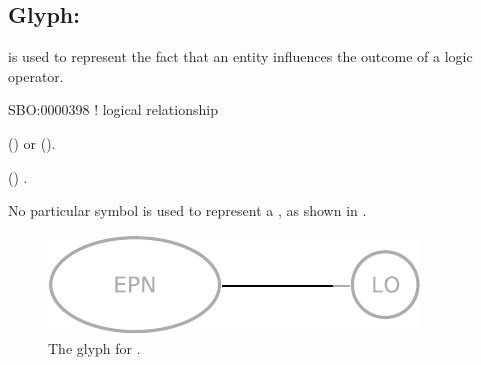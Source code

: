\subsection{Glyph: }
\label{sec:logicArc}

 is used to represent the fact that an entity  influences
the outcome of a logic operator.

\begin{glyphDescription}

\glyphSboTerm
SBO:0000398 ! logical relationship

\glyphOrigin
{}  () or  ().

\glyphTarget
{}  () .

\glyphSymbol
No particular symbol is used to represent a , as shown in .

\end{glyphDescription}

\begin{figure}[H]
  \centering
  \includegraphics{images/logicArc}
  \caption{The \PD glyph for .}
  \label{fig:logicArc}
\end{figure}

